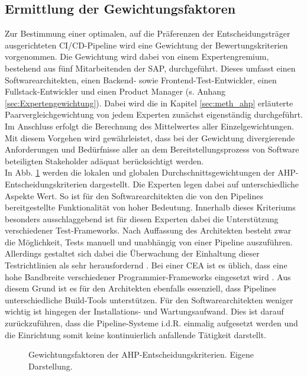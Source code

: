 \subsection{Ermittlung der Gewichtungsfaktoren}
\label{sec:Gewichtung}
Zur Bestimmung einer optimalen, auf die Präferenzen der Entscheidungsträger ausgerichteten CI/CD-Pipeline wird eine Gewichtung der Bewertungskriterien vorgenommen. Die Gewichtung wird dabei von einem Expertengremium, bestehend aus fünf Mitarbeitenden der SAP, durchgeführt. Dieses umfasst einen Softwarearchitekten, einen Backend- sowie Frontend-Test-Entwickler, einen Fullstack-Entwickler und einen Product Manager (s. Anhang \ref{sec:Expertengewichtung}). Dabei wird die in Kapitel \ref{sec:meth_ahp} erläuterte Paarvergleichgewichtung von jedem Experten zunächst eigenständig durchgeführt. Im Anschluss erfolgt die Berechnung des Mittelwertes aller Einzelgewichtungen. Mit diesem Vorgehen wird gewährleistet, dass bei der Gewichtung divergierende Anforderungen und Bedürfnisse aller an dem Bereitstellungsprozess von Software beteiligten Stakeholder adäquat berücksichtigt werden.\\   
In Abb. \ref{fig:AHP_G} werden die lokalen und globalen Durchschnittsgewichtungen der AHP-Entscheidungskriterien dargestellt.
Die Experten legen dabei auf unterschiedliche Aspekte Wert. So ist für den Softwarearchitekten die von den Pipelines bereitgestellte Funktionalität von hoher Bedeutung. Innerhalb dieses Kriteriums besonders ausschlaggebend ist für diesen Experten dabei die Unterstützung verschiedener Test-Frameworks. Nach Auffassung des Architekten besteht zwar die Möglichkeit, Tests manuell und unabhängig von einer Pipeline auszuführen. Allerdings gestaltet sich dabei die Überwachung der Einhaltung dieser Testrichtlinien als sehr herausfordernd \cite[Z. 18 ff.]{SoftwareArchitektSAPDTSIntegration.}. Bei einer CEA ist es üblich, dass eine hohe Bandbreite verschiedener Programmier-Frameworks eingesetzt wird \cite[Z. 13 ff.]{SoftwareArchitektSAPDTSIntegration.}. Aus diesem Grund ist es für den Architekten ebenfalls essenziell, dass Pipelines unterschiedliche Build-Tools unterstützen. Für den Softwarearchitekten weniger wichtig ist hingegen der Installations- und Wartungsaufwand. Dies ist darauf zurückzuführen, dass die Pipeline-Systeme i.d.R. einmalig aufgesetzt werden und die Einrichtung somit keine kontinuierlich anfallende Tätigkeit darstellt.
\begin{center}
	\begin{figure}[H]
		\centering
		\caption[Gewichtungsfaktoren der AHP-Entscheidungskriterien]{Gewichtungsfaktoren der AHP-Entscheidungskriterien. Eigene Darstellung.}
		\label{fig:AHP_G}
	\end{figure}
\end{center}
